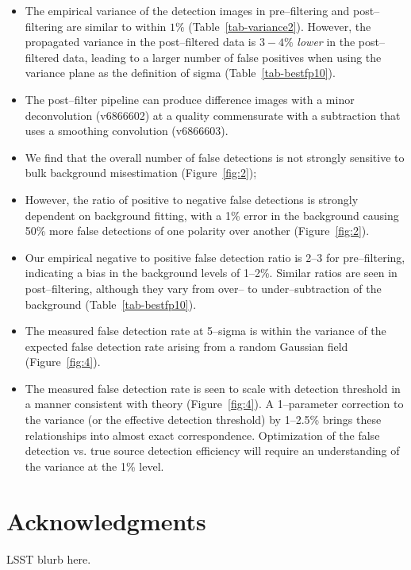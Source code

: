 \documentclass[floatfix, apj]{emulateapj}
\begin{document}
\begin{itemize}
\item The empirical variance of the detection images in pre--filtering
  and post--filtering are similar to within $1\%$
  (Table~\ref{tab-variance2}).  However, the propagated variance in the
  post--filtered data is $3-4\%$ {\it lower} in the post--filtered data,
  leading to a larger number of false positives when using the
  variance plane as the definition of sigma (Table~\ref{tab-bestfp10}).



\item The post--filter pipeline can produce difference images with a
  minor deconvolution (v6866602) at a quality commensurate with a subtraction that uses a
  smoothing convolution (v6866603).


\item We find that the overall number of false detections is not
  strongly sensitive to bulk background misestimation
  (Figure~\ref{fig:2});

\item However, the ratio of positive to negative false detections is
  strongly dependent on background fitting, with a 1\% error in the background
  causing 50\% more false detections of one polarity over another
  (Figure~\ref{fig:2}).

\item Our empirical negative to positive false detection ratio is 2--3 for pre--filtering, 
  indicating a bias in the background levels of 1--2\%.  Similar ratios are seen
  in post--filtering, although they vary from over-- to
  under--subtraction of the background
  (Table~\ref{tab-bestfp10}). 


\item The measured false detection rate at 5--sigma is within the variance of the 
  expected false detection rate arising from a random Gaussian field (Figure~\ref{fig:4}).

\item The measured false detection rate is seen to scale with detection
  threshold in a manner consistent with theory (Figure~\ref{fig:4}).
  A 1--parameter correction to the variance (or the effective detection threshold) by 1--2.5\% brings these relationships
  into almost exact correspondence.  Optimization of the false detection vs. true source
  detection efficiency will require an understanding of the variance at the 1\% level.

\end{itemize}

\section*{Acknowledgments}
LSST blurb here.



\end{document}
